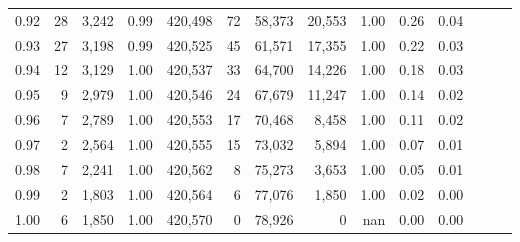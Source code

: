 \begin{tabular}{rrrrrrrrrrrrrr}
0.92 &     28 &  3,242 &  0.99 &  420,498 &       72 &  58,373 &  20,553 &  1.00 &  0.26 &      0.04 \\
0.93 &     27 &  3,198 &  0.99 &  420,525 &       45 &  61,571 &  17,355 &  1.00 &  0.22 &      0.03 \\
0.94 &     12 &  3,129 &  1.00 &  420,537 &       33 &  64,700 &  14,226 &  1.00 &  0.18 &      0.03 \\
0.95 &      9 &  2,979 &  1.00 &  420,546 &       24 &  67,679 &  11,247 &  1.00 &  0.14 &      0.02 \\
0.96 &      7 &  2,789 &  1.00 &  420,553 &       17 &  70,468 &   8,458 &  1.00 &  0.11 &      0.02 \\
0.97 &      2 &  2,564 &  1.00 &  420,555 &       15 &  73,032 &   5,894 &  1.00 &  0.07 &      0.01 \\
0.98 &      7 &  2,241 &  1.00 &  420,562 &        8 &  75,273 &   3,653 &  1.00 &  0.05 &      0.01 \\
0.99 &      2 &  1,803 &  1.00 &  420,564 &        6 &  77,076 &   1,850 &  1.00 &  0.02 &      0.00 \\
1.00 &      6 &  1,850 &  1.00 &  420,570 &        0 &  78,926 &       0 &   nan &  0.00 &      0.00 \\
\bottomrule
\end{tabular}
